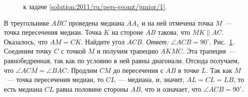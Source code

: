 \ifsolution
\begin{figure}\centering
    \caption{к задаче \ref{solution:2011/ru/pers-geomt/junior/1}.}
    \label{fig:solution:2011/ru/pers-geomt/junior/1}
\end{figure}
\fi %

\problem
В треугольнике $ABC$ проведена медиана $A A_1$ и на ней отмечена точка $M$~---
точка пересечения медиан.
Точка $K$ на стороне $AB$ такова, что $MK \parallel AC$.
Оказалось, что $AM = CK$.
Найдите угол $ACB$.
\solution
\label{solution:2011/ru/pers-geomt/junior/1}%
\emph{Ответ:} $\angle ACB = 90^\circ$.
Рис.~\ref{fig:solution:2011/ru/pers-geomt/junior/1}.
Соединим точку $C$ с точкой $M$ и получим трапецию $AKMC$.
Эта трапеция~--- равнобедренная, так как по условию в ней равны диагонали.
Отсюда получаем, что $\angle ACM = \angle BAC$.
Продлим $CM$ до пересечения с $AB$ в точке $L$.
Так как $M$~--- точка пересечения медиан, то $CL$~--- медиана, и, значит,
$AL = CL = LB$, то есть медиана $CL$ равна половине стороны $AB$, что и
означает, что $\angle ACB = 90^\circ$.
\endproblem
